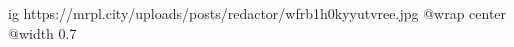  
 
 
 
 

\ifcmt
  ig https://mrpl.city/uploads/posts/redactor/wfrb1h0kyyutvree.jpg
  @wrap center
  @width 0.7
\fi
